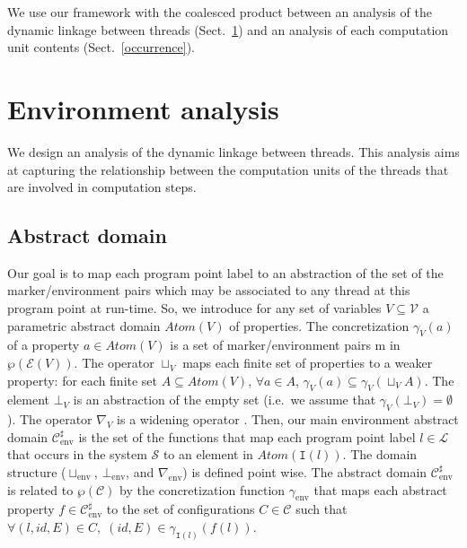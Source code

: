 \documentclass{article}
\newcommand{\Names}{\mathcal{V}}
\newcommand{\Labels}{\mathcal{L}}
\newcommand{\rec}{?}
\newcommand{\eme}{!}
\newcommand{\prolabel}{\Labels}
\newcommand{\System}{\mathcal{S}}
\newcommand{\interface}{\mathtt{I}}
\newcommand{\env}[1]{\mathcal{E}(#1)}
\newcommand{\states}{\mathcal{C}}
\newcommand{\Vrec}{V_{\rec}}
\newcommand{\Veme}{V_{\eme}}
\newcommand{\wid}[1]{\nabla_{#1}}
\newcommand{\Atomekey}{\textit{Atom}}
\newcommand{\Atomeshortkey}{}
\newcommand{\Atome}[1]{\Atomekey(#1)}
\newcommand{\gammaatome}[1]{\gamma^{\Atomeshortkey}_{#1}}
\newcommand{\cupatome}[1]{\sqcup^{\Atomeshortkey}_{#1}}
\newcommand{\botatome}[1]{\bot^{\Atomeshortkey}_{#1}}
\newcommand{\widatome}[1]{\nabla^{\Atomeshortkey}_{#1}}
\newcommand{\Envkey}{\mathrm{env}}
\newcommand{\Envdom}{\mathcal{C}^{\sharp}_{\Envkey}}
\newcommand{\gammaenv}{\gamma_{\Envkey}}
\newcommand{\botenv}{\bot_{\Envkey}}
\newcommand{\cupenv}{\sqcup_{\Envkey}}
\begin{document}
We use our framework with the coalesced product between an analysis of the dynamic linkage between  threads (Sect.~\ref{environment}) and an analysis of each computation unit contents (Sect.~\ref{occurrence}).

\section{Environment analysis}
\label{environment}

\newcommand{\allconstraint}{\textit{Constraints}(\Vrec,\Veme)}
\newcommand{\constraintset}{C}
\newcommand{\constraint}{c}

We design an analysis of the dynamic linkage between threads. 
This analysis aims at capturing the relationship between the computation units of the threads that are involved in computation steps.


\subsection{Abstract domain}
Our goal is to map each program point label to an abstraction of the set of the marker/environment pairs which may be associated to any thread at this program point at run-time. 
So, we introduce for any set of variables $V\subseteq \Names$  a parametric abstract domain  $\Atome{V}$  of properties.
The concretization $\gammaatome{V}(a)$ of a property $a\in \Atome{V}$ is 
a set of marker/environment pairs m in $\wp(\env{V})$.
The operator $\cupatome{V}$ maps each finite set of properties to a weaker
property: for each finite set $A \subseteq \Atome{V}$, $\forall a\in A$, $\gammaatome{V}(a)\subseteq  \gammaatome{V}(\cupatome{V} A)$. 
The element $\botatome{V}$ is an abstraction of the empty set 
(i.e.~we assume that $\gammaatome{V}(\botatome{V})=\emptyset$).
The operator $\widatome{V}$ is a widening operator \cite{cc:galois-widening}.
Then, our main environment abstract domain $\Envdom$
is the set of the functions that map each program point label $l\in\prolabel$ that occurs in the system $\System$ to an element in $\Atome{\interface(l)}$. 
The domain structure ($\cupenv$, $\botenv$, and $\wid{\Envkey}$)  is defined point wise. 
The abstract domain $\Envdom$  is related to $\wp(\states)$ by
the concretization function $\gammaenv$ that maps each abstract property
$f\in\Envdom$ to the set of  configurations
$C\in\states$ such that $\forall (l,\textit{id},E)\in C,\;(\textit{id},E)\in \gamma_{\interface(l)}(f(l))$.
\end{document}
